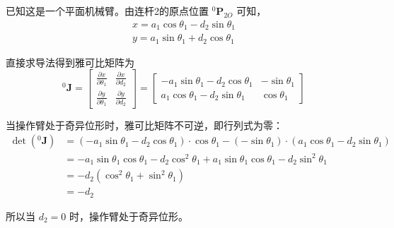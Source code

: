 \documentclass{homework}
\begin{document}
\question

\begin{sol}

已知这是一个平面机械臂。由连杆2的原点位置 $ ^0\mathbf{P}_{2O} $ 可知，
\begin{align*}
  x = a_1 \cos\theta_1 - d_2 \sin\theta_1 \\
  y = a_1 \sin\theta_1 + d_2 \cos\theta_1
\end{align*}

直接求导法得到雅可比矩阵为
\[
  {^0}\mathbf{J} =
  \begin{bmatrix}
    \frac{\partial x}{\partial \theta_1} & \frac{\partial x}{\partial d_2} \\
    \frac{\partial y}{\partial \theta_1} & \frac{\partial y}{\partial d_2}
  \end{bmatrix} =
  \begin{bmatrix}
    -a_1 \sin\theta_1 - d_2 \cos\theta_1 & -\sin\theta_1 \\
    a_1 \cos\theta_1 - d_2 \sin\theta_1 & \cos\theta_1
  \end{bmatrix}
\]

当操作臂处于奇异位形时，雅可比矩阵不可逆，即行列式为零：
\begin{align*}
  \det({^0}\mathbf{J}) &= (-a_1 \sin\theta_1 - d_2 \cos\theta_1) \cdot \cos\theta_1 - (-\sin\theta_1) \cdot (a_1 \cos\theta_1 - d_2 \sin\theta_1) \\
  &= -a_1 \sin\theta_1 \cos\theta_1 - d_2 \cos^2\theta_1 + a_1 \sin\theta_1 \cos\theta_1 - d_2 \sin^2\theta_1 \\
  &= -d_2 (\cos^2\theta_1 + \sin^2\theta_1) \\
  &= -d_2
\end{align*}

所以当 $ d_2 = 0 $ 时，操作臂处于奇异位形。

\end{sol}

\question
\end{document}
